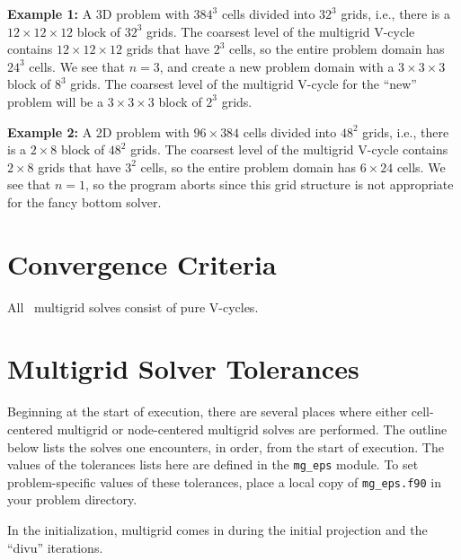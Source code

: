 {\bf Example 1:} A 3D problem with $384^3$ cells divided into $32^3$ grids, i.e., 
there is a $12\times 12\times 12$ block of $32^3$ grids.  The coarsest level of the 
multigrid V-cycle contains $12\times 12\times 12$ grids that have $2^3$ cells, so the 
entire problem domain has $24^3$ cells.  We see that $n=3$, and create a new problem 
domain with a $3\times 3\times 3$ block of $8^3$ grids.  The coarsest level of the 
multigrid V-cycle for the ``new'' problem will be a $3\times 3\times 3$ block of 
$2^3$ grids.

{\bf Example 2:} A 2D problem with $96\times 384$ cells divided into $48^2$ grids, i.e., 
there is a $2\times 8$ block of $48^2$ grids.  The coarsest level of the multigrid 
V-cycle contains $2\times 8$ grids that have $3^2$ cells, so the entire problem 
domain has $6\times 24$ cells.  We see that $n=1$, so the program aborts since this grid
structure is not appropriate for the fancy bottom solver.




\section{Convergence Criteria}

All \maestro\ multigrid solves consist of pure V-cycles.  


\section{Multigrid Solver Tolerances}

\label{sec:mgtol}

Beginning at the start of execution, there are several places where
either cell-centered multigrid or node-centered multigrid solves are
performed.  The outline below lists the solves one encounters, in order,
from the start of execution.  The values of the tolerances lists here
are defined in the {\tt mg\_eps} module.  To set problem-specific values
of these tolerances, place a local copy of {\tt mg\_eps.f90} in your
problem directory.

In the initialization, multigrid comes in during the initial projection
and the ``divu'' iterations.

